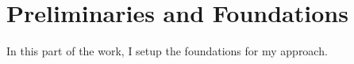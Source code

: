\chapter{Preliminaries and Foundations}
\label{ch:preliminaries}

In this part of the work, I setup the foundations for my approach.

%

%
%